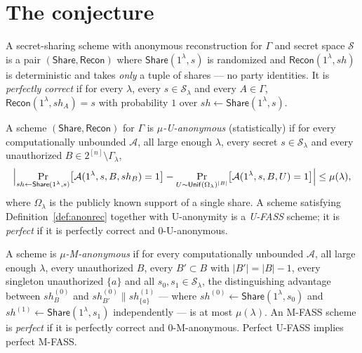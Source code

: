 \documentclass{conjura-conjecture}
\newcommand{\Sh}{\mathcal{S}}
\newcommand{\Share}{\mathsf{Share}}
\newcommand{\Recon}{\mathsf{Recon}}
\newcommand{\Unif}{\mathsf{Unif}}
\begin{document}
\section{The conjecture}\label{sec:conjectures}

\begin{definition}\label{def:anonrec}
A secret-sharing scheme with anonymous reconstruction for $\Gamma$ and
secret space $\Sh$ is a pair $(\Share, \Recon)$ where
$\Share(1^{\lambda}, s)$ is randomized and $\Recon(1^{\lambda}, sh)$ is
deterministic and takes \emph{only} a tuple of shares --- no party
identities. It is \emph{perfectly correct} if for every $\lambda$, every
$s \in \Sh_{\lambda}$ and every $A \in \Gamma$,
$\Recon(1^{\lambda}, sh_{A}) = s$ with probability $1$ over $sh
\leftarrow \Share(1^{\lambda}, s)$.
\end{definition}

\begin{definition}
  \label{def:uanon}
A scheme $(\Share, \Recon)$ for $\Gamma$ is \emph{$\mu$-U-anonymous}
(statistically) if for every computationally unbounded $\mathcal{A}$, all
large enough $\lambda$, every secret $s \in \Sh_{\lambda}$ and every
unauthorized $B \in 2^{[n]} \setminus \Gamma_{\lambda}$,
\[
  \Bigl| \Pr_{sh \leftarrow \Share(1^{\lambda},s)}\bigl[
  \mathcal{A}(1^{\lambda}, s, B, sh_{B}) = 1 \bigr]
  - \Pr_{U \sim \Unif(\Omega_{\lambda})^{|B|}}\bigl[
  \mathcal{A}(1^{\lambda}, s, B, U) = 1 \bigr] \Bigr| \le \mu(\lambda),
\]
where $\Omega_{\lambda}$ is the publicly known support of a single share.
A scheme satisfying Definition~\ref{def:anonrec} together with
U-anonymity is a \emph{U-FASS} scheme; it is \emph{perfect} if it is
perfectly correct and $0$-U-anonymous.
\end{definition}

\begin{definition}\label{def:manon}
A scheme is \emph{$\mu$-M-anonymous} if for every computationally
unbounded $\mathcal{A}$, all large enough $\lambda$, every unauthorized
$B$, every $B' \subset B$ with $|B'| = |B| - 1$, every singleton
unauthorized $\{a\}$ and all $s_{0}, s_{1} \in \Sh_{\lambda}$, the
distinguishing advantage between $sh^{(0)}_{B}$ and $sh^{(0)}_{B'} \|
sh^{(1)}_{\{a\}}$ --- where $sh^{(0)} \leftarrow
\Share(1^{\lambda},s_{0})$ and $sh^{(1)} \leftarrow
\Share(1^{\lambda},s_{1})$ independently --- is at most $\mu(\lambda)$.
An M-FASS scheme is \emph{perfect} if it is perfectly correct and
$0$-M-anonymous. Perfect U-FASS implies perfect M-FASS\@.
\end{definition}
\end{document}
